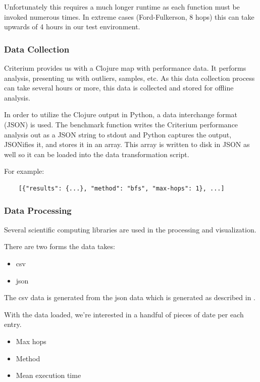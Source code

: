 			Unfortunately this requires a much longer runtime as each function must be invoked numerous times.  In extreme cases (Ford-Fulkerson, 8 hops) this can take upwards of 4 hours in our test environment.
		
			\subsubsection{Data Collection}
			\label{sec:data-collection}
				Criterium provides us with a Clojure map with performance data.  It performs analysis, presenting us with outliers, samples, etc.  As this data collection process can take several hours or more, this data is collected and stored for offline analysis.
				
				In order to utilize the Clojure output in Python, a data interchange format (JSON) is used.  The benchmark function writes the Criterium performance analysis out as a JSON string to stdout and Python captures the output, JSONifies it, and stores it in an array.  This array is written to disk in JSON as well so it can be loaded into the data transformation script.
				
				For example:
				
				\begin{verbatim}
	[{"results": {...}, "method": "bfs", "max-hops": 1}, ...]
				\end{verbatim}
			
			\subsubsection{Data Processing}
			\label{sec:data-processing}
				Several scientific computing libraries are used in the processing and visualization.
				
				There are two forms the data takes:
				
				\begin{itemize}
					\item \gls{csv}
					\item \gls{json}
				\end{itemize}
				
				The \gls{csv} data is generated from the \gls{json} data which is generated as described in .
				
				With the data loaded, we're interested in a handful of pieces of date per each entry.
				
				\begin{itemize}
					\item Max hops
					\item Method
					\item Mean execution time
				\end{itemize}
				
